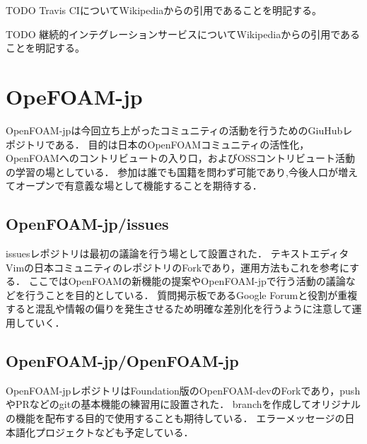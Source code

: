 \documentclass{ltjoc}
\begin{document}
TODO Travis CIについてWikipediaからの引用であることを明記する。

TODO 継続的インテグレーションサービスについてWikipediaからの引用であることを明記する。
%
\section{OpeFOAM-jp}
OpenFOAM-jp\cite{URL:OpenFOAM-jp}は今回立ち上がったコミュニティの活動を行うためのGiuHubレポジトリである．
目的は日本のOpenFOAMコミュニティの活性化，OpenFOAMへのコントリビュートの入り口，およびOSSコントリビュート活動の学習の場としている．
参加は誰でも国籍を問わず可能であり,今後人口が増えてオープンで有意義な場として機能することを期待する．
%
\subsection{OpenFOAM-jp/issues}
issuesレポジトリ\cite{URL:OpenFOAM-jp-issues}は最初の議論を行う場として設置された．
テキストエディタVimの日本コミュニティのレポジトリ\cite{URL:vim-jp}のForkであり，運用方法もこれを参考にする．
ここではOpenFOAMの新機能の提案やOpenFOAM-jpで行う活動の議論などを行うことを目的としている．
質問掲示板であるGoogle Forumと役割が重複すると混乱や情報の偏りを発生させるため明確な差別化を行うように注意して運用していく．
%
\subsection{OpenFOAM-jp/OpenFOAM-jp}
OpenFOAM-jpレポジトリ\cite{URL:OpenFOAM-jp-OpenFOAM-jp}はFoundation版のOpenFOAM-devのForkであり，pushやPRなどのgitの基本機能の練習用に設置された．
branchを作成してオリジナルの機能を配布する目的で使用することも期待している．
エラーメッセージの日本語化プロジェクトなども予定している．
%
\end{document}

